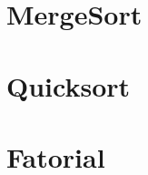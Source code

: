 \section{MergeSort}
\begin{footnotesize}

\end{footnotesize}

\section{Quicksort}
\begin{footnotesize}

\end{footnotesize}

\section{Fatorial}
\begin{footnotesize}

\end{footnotesize}